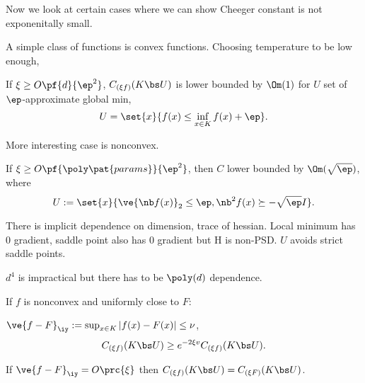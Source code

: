 Now we look at certain cases where we can show Cheeger constant is not exponenitally small.

A simple class of functions is convex functions. Choosing temperature to be low enough,
\begin{pr}
If $\xi\ge O\pf{d}{\ep^2}$, $C_{(\xi f)}(K\bs U)$ is lower bounded by $\Om(1)$ for $U$ set of $\ep$-approximate global min,
$$
U = \set{x}{f(x)\le \inf_{x\in K}f(x) + \ep}.
$$
\end{pr}

More interesting case is nonconvex.
\begin{pr}
If $\xi\ge O\pf{\poly\pat{params}}{\ep^2}$, then $C$ lower bounded by $\Om(\sqrt \ep)$, where
$$
U:= \set{x}{\ve{\nb f(x)}_2\le \ep , \nb^2 f(x)\succeq -\sqrt \ep I}.
$$
%
\end{pr}
There is implicit dependence on dimension, trace of hessian. 
Local minimum has 0 gradient, saddle point also has 0 gradient but H is non-PSD. $U$ avoids strict saddle points.

$d^4$ is impractical but there has to be $\poly(d)$ dependence. %





If $f$ is nonconvex and uniformly close to $F$:
\begin{pr}
$\ve{f-F}_{\iy} := \sup_{x\in K}|f(x)-F(x)|\le \nu$, $$C_{(\xi f)}(K\bs U) \ge e^{-2\xi v}C_{(\xi f)} (K\bs U).$$
\end{pr}
If $\ve{f-F}_{\iy} = O\prc{\xi} $ then $C_{(\xi f)}(K\bs U) = C_{(\xi F)}(K\bs U)$. 

